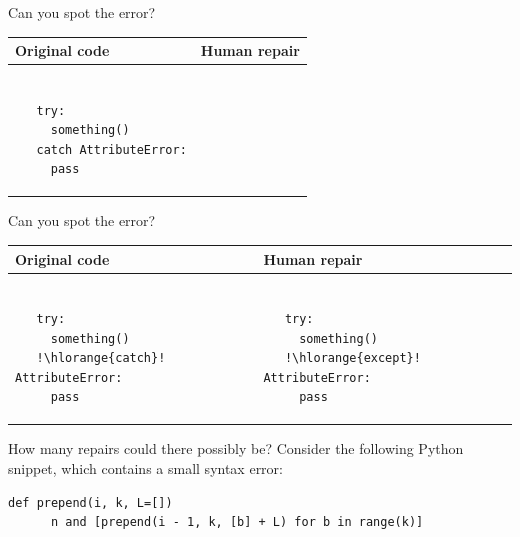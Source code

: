 \documentclass{beamer}
\begin{document}
\begin{frame}[fragile]{Can you spot the error?}
  \begin{center}
    \begin{tabular}{|m{5.5cm}|m{5.5cm}|}
      \hline \rule{0pt}{2.5ex}\textbf{Original code}\rule[-1ex]{0pt}{2ex} &  \rule{0pt}{2.5ex}\textbf{Human repair}\rule[-1ex]{0pt}{2ex} \\\hline
      \begin{lstlisting}[escapechar=!, basicstyle=\linespread{1.3}\ttfamily\footnotesize]

   try:
     something()
   catch AttributeError:
     pass

      \end{lstlisting} & \begin{lstlisting}[escapechar=!, basicstyle=\linespread{1.3}\ttfamily\footnotesize]

      \end{lstlisting} \\\hline
    \end{tabular}
  \end{center}
\end{frame}

\begin{frame}[fragile]{Can you spot the error?}
  \begin{center}
    \begin{tabular}{|m{5.5cm}|m{5.5cm}|}
      \hline \rule{0pt}{2.5ex}\textbf{Original code}\rule[-1ex]{0pt}{2ex} &  \rule{0pt}{2.5ex}\textbf{Human repair}\rule[-1ex]{0pt}{2ex} \\\hline
      \begin{lstlisting}[escapechar=!, basicstyle=\linespread{1.3}\ttfamily\footnotesize]

   try:
     something()
   !\hlorange{catch}! AttributeError:
     pass

      \end{lstlisting} & \begin{lstlisting}[escapechar=!, basicstyle=\linespread{1.3}\ttfamily\footnotesize]

   try:
     something()
   !\hlorange{except}! AttributeError:
     pass

      \end{lstlisting} \\\hline
    \end{tabular}
  \end{center}
\end{frame}

\begin{frame}[t,fragile]{How many repairs could there possibly be?}
  Consider the following Python snippet, which contains a small syntax error:\\

  \begin{lstlisting}[escapechar=!, basicstyle=\linespread{1.3}\ttfamily\footnotesize]
    def prepend(i, k, L=[])
      n and [prepend(i - 1, k, [b] + L) for b in range(k)]
  \end{lstlisting}
\end{frame}
\end{document}
